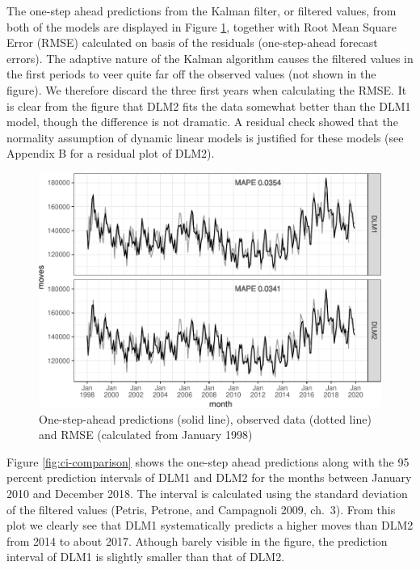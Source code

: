 \documentclass[]{article}
\begin{document}
The one-step ahead predictions from the Kalman filter, or filtered
values, from both of the models are displayed in Figure
\ref{fig:dlm-filtered}, together with Root Mean Square Error (RMSE)
calculated on basis of the residuals (one-step-ahead forecast errors).
The adaptive nature of the Kalman algorithm causes the filtered values
in the first periods to veer quite far off the observed values (not
shown in the figure). We therefore discard the three first years when
calculating the RMSE. It is clear from the figure that DLM2 fits the
data somewhat better than the DLM1 model, though the difference is not
dramatic. A residual check showed that the normality assumption of
dynamic linear models is justified for these models (see Appendix B for
a residual plot of DLM2).

\begin{figure}
\centering
\includegraphics{../figs/freq--dlm-filtered-1.pdf}
\caption{\label{fig:dlm-filtered}One-step-ahead predictions (solid line),
observed data (dotted line) and RMSE (calculated from January 1998)}
\end{figure}

Figure \ref{fig:ci-comparison} shows the one-step ahead predictions
along with the 95 percent prediction intervals of DLM1 and DLM2 for the
months between January 2010 and December 2018. The interval is
calculated using the standard deviation of the filtered values (Petris,
Petrone, and Campagnoli 2009, ch.~3). From this plot we clearly see that
DLM1 systematically predicts a higher moves than DLM2 from 2014 to about
2017. Athough barely visible in the figure, the prediction interval of
DLM1 is slightly smaller than that of DLM2.
\end{document}
